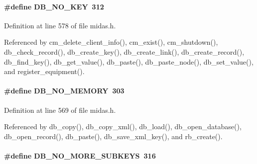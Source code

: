 \paragraph[{DB\_\-NO\_\-KEY}]{\setlength{\rightskip}{0pt plus 5cm}\#define DB\_\-NO\_\-KEY~312}\hfill\label{group__err23_ga8c6c8ed2099cf2468f0c7c6cd475fe7e}

\begin{DoxyItemize}
\item 
\end{DoxyItemize}

Definition at line 578 of file midas.h.

Referenced by cm\_\-delete\_\-client\_\-info(), cm\_\-exist(), cm\_\-shutdown(), db\_\-check\_\-record(), db\_\-create\_\-key(), db\_\-create\_\-link(), db\_\-create\_\-record(), db\_\-find\_\-key(), db\_\-get\_\-value(), db\_\-paste(), db\_\-paste\_\-node(), db\_\-set\_\-value(), and register\_\-equipment().
\paragraph[{DB\_\-NO\_\-MEMORY}]{\setlength{\rightskip}{0pt plus 5cm}\#define DB\_\-NO\_\-MEMORY~303}\hfill\label{group__err23_ga53ba0057ac441528c24b8485c80dbbe3}

\begin{DoxyItemize}
\item 
\end{DoxyItemize}

Definition at line 569 of file midas.h.

Referenced by db\_\-copy(), db\_\-copy\_\-xml(), db\_\-load(), db\_\-open\_\-database(), db\_\-open\_\-record(), db\_\-paste(), db\_\-save\_\-xml\_\-key(), and rb\_\-create().
\paragraph[{DB\_\-NO\_\-MORE\_\-SUBKEYS}]{\setlength{\rightskip}{0pt plus 5cm}\#define DB\_\-NO\_\-MORE\_\-SUBKEYS~316}\hfill\label{group__err23_gaf2249d36fd8ffb254cd33a3bbc899638}

\begin{DoxyItemize}
\item 
\end{DoxyItemize}

